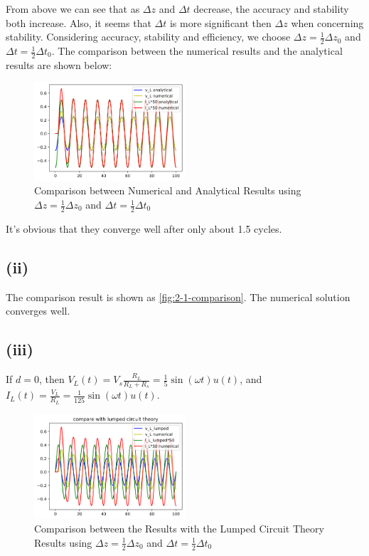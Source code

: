 \documentclass{article}
\begin{document}
        From above we can see that as $\Delta z$ and $\Delta t$ decrease, the accuracy and stability both increase. Also, it seems that $\Delta t$ is more significant then $\Delta z$ when concerning stability. Considering accuracy, stability and efficiency, we choose $\Delta z = \frac{1}{2}\Delta z_0$ and $\Delta t = \frac{1}{2}\Delta t_0$. The comparison between the numerical results and the analytical results are shown below:

        \begin{figure}[H]
            \centering
            \includegraphics[width=0.5\textwidth]{img/2_1_comparison.png}
            \caption{Comparison between Numerical and Analytical Results using $\Delta z = \frac{1}{2}\Delta z_0$ and $\Delta t = \frac{1}{2}\Delta t_0$}
            \label{fig:2-1-comparison}
        \end{figure}

        It's obvious that they converge well after only about 1.5 cycles.

    \subsection{(ii)}

        The comparison result is shown as \autoref{fig:2-1-comparison}. The numerical solution converges well.

    \subsection{(iii)}

        If $d=0$, then $V_L(t) = V_s \frac{R_L}{R_L + R_s} = \frac{1}{5}\sin(\omega t)u(t)$, and $I_L(t) = \frac{V_L}{R_L} = \frac{1}{125}\sin(\omega t)u(t)$.

        \begin{figure}[H]
            \centering
            \includegraphics[width=0.5\textwidth]{img/2_3_comparison.png}
            \caption{Comparison between the Results with the Lumped Circuit Theory Results using $\Delta z = \frac{1}{2}\Delta z_0$ and $\Delta t = \frac{1}{2}\Delta t_0$}
            \label{fig:2-3-comparison}
        \end{figure}
\end{document}

